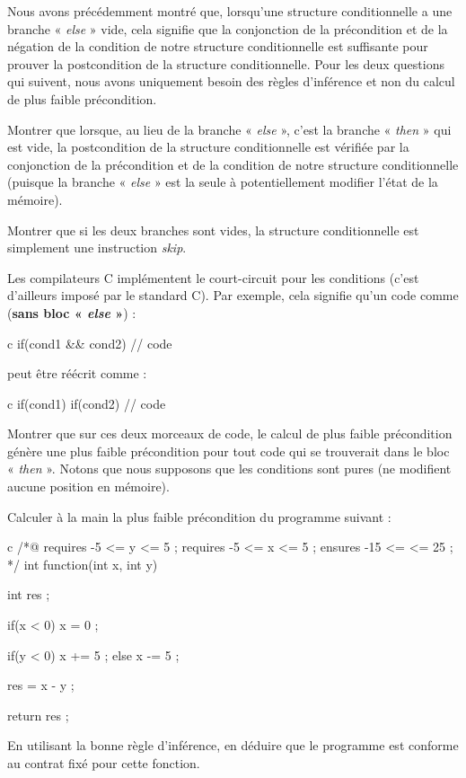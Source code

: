 Nous avons précédemment montré que, lorsqu'une structure conditionnelle a une branche
« \textit{else} » vide, cela signifie que la conjonction de la précondition et de la négation
de la condition de notre structure conditionnelle est suffisante pour prouver la
postcondition de la structure conditionnelle.
Pour les deux questions qui suivent, nous avons uniquement besoin des règles d'inférence
et non du calcul de plus faible précondition.


Montrer que lorsque, au lieu de la branche « \textit{else} », c'est la branche « \textit{then} » qui est
vide, la postcondition de la structure conditionnelle est vérifiée par la conjonction de
la précondition et de la condition de notre structure conditionnelle (puisque
la branche « \textit{else} » est la seule à potentiellement modifier l'état de
la mémoire).


Montrer que si les deux branches sont vides, la structure conditionnelle est simplement une
instruction \textit{skip}.






Les compilateurs C implémentent le court-circuit pour les conditions (c'est d'ailleurs
imposé par le standard C). Par exemple, cela signifie qu'un code comme (\textbf{sans
bloc « \textit{else} »}) :


\begin{CodeBlock}{c}
if(cond1 && cond2){
  // code
}
\end{CodeBlock}


peut être réécrit comme :


\begin{CodeBlock}{c}
if(cond1){
  if(cond2){
    // code
  }
}
\end{CodeBlock}


Montrer que sur ces deux morceaux de code, le calcul de plus faible précondition
génère une plus faible précondition pour tout code qui se trouverait dans le bloc
« \textit{then} ». Notons que nous supposons que les conditions sont pures (ne modifient aucune
position en mémoire).






Calculer à la main la plus faible précondition du programme suivant :


\begin{CodeBlock}{c}
/*@
  requires -5 <= y <= 5 ;
  requires -5 <= x <= 5 ;
  ensures  -15 <= \result <= 25 ;
*/
int function(int x, int y){
  int res ;

  if(x < 0){
    x = 0 ;
  }

  if(y < 0){
    x += 5 ;
  } else {
    x -= 5 ;
  }

  res = x - y ;

  return res ;
}
\end{CodeBlock}



En utilisant la bonne règle d'inférence, en déduire que le programme est
conforme au contrat fixé pour cette fonction.


